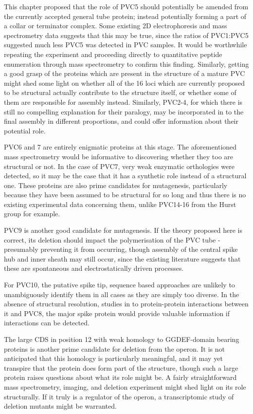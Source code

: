 This chapter proposed that the role of PVC5 should potentially be amended from the currently accepted general tube protein; instead potentially forming a part of a collar or terminator complex. Some existing 2D electrophoresis and mass spectrometry data suggests that this may be true, since the ratios of PVC1:PVC5 suggested much less PVC5 was detected in PVC samples. It would be worthwhile repeating the experiment and proceeding directly to quantitative peptide enumeration through mass spectrometry to confirm this finding. Similarly, getting a good grasp of the proteins which are present in the structure of a mature PVC might shed some light on whether all of the 16 loci which are currently proposed to be structural actually contribute to the structure itself, or whether some of them are responsible for assembly instead. Similarly, PVC2-4, for which there is still no compelling explanation for their paralogy, may be incorporated in to the final assembly in different proportions, and could offer information about their potential role.

PVC6 and 7 are entirely enigmatic proteins at this stage. The aforementioned mass spectrometry would be informative to discovering whether they too are structural or not. In the case of PVC7, very weak enzymatic orthologies were detected, so it may be the case that it has a synthetic role instead of a structural one. These proteins are also prime candidates for mutagenesis, particularly because they have been assumed to be structural for so long and thus there is no existing experimental data concerning them, unlike PVC14-16 from the Hurst group for example.

PVC9 is another good candidate for mutagenesis. If the theory proposed here is correct, its deletion should impact the polymerisation of the PVC tube - presumably preventing it from occurring, though assembly of the central spike hub and inner sheath may still occur, since the existing literature suggests that these are spontaneous and electrostatically driven processes.

For PVC10, the putative spike tip, sequence based approaches are unlikely to unambiguously identify them in all cases as they are simply too diverse. In the absence of structural resolution, studies in to protein-protein interactions between it and PVC8, the major spike protein would provide valuable information if interactions can be detected.

The large CDS in position 12 with weak homology to GGDEF-domain bearing proteins is another prime candidate for deletion from the operon. It is not anticipated that this homology is particularly meaningful, and it may yet transpire that the protein does form part of the structure, though such a large protein raises questions about what its role might be. A fairly straightforward mass spectrometry, imaging, and deletion experiment might shed light on its role structurally. If it truly is a regulator of the operon, a transcriptomic study of deletion mutants might be warranted.

